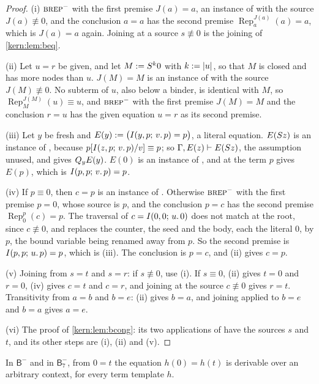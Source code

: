 \begin{proof}
(i) $\rulename{BRep}^{-}$ with the first premise $J(a)=a$, an instance of
 with the source $J(a)\not\equiv 0$, and the conclusion $a=a$ has
the second premise $\operatorname{Rep}_{a}^{J(a)}(a)=a$, which is $J(a)=a$
again.  Joining at a source $s\not\equiv 0$ is the joining of
\cref{kern:lem:beq}.

(ii) Let $u=r$ be given, and let $M\mathrel{:=}S^{k}0$ with $k\mathrel{:=}|u|$, so
that $M$ is closed and has more nodes than $u$.  $J(M)=M$ is an instance of
 with the source $J(M)\not\equiv 0$.  No subterm of $u$, also
below a binder, is identical with $M$, so
$\operatorname{Rep}_{M}^{J(M)}(u)\equiv u$, and $\rulename{BRep}^{-}$ with the
first premise $J(M)=M$ and the conclusion $r=u$ has the given equation $u=r$
as its second premise.

(iii) Let $y$ be fresh and $E(y)\mathrel{:=}\bigl(I(y,p;\,v.\,p)=p\bigr)$, a
literal equation.  $E(S z)$ is an instance of , because
$p[I(z,p;\,v.\,p)/v]\equiv p$; so $\Gamma,E(z)\vdash E(S z)$, the
assumption unused, and  gives $Q_{y}E(y)$.  $E(0)$ is an
instance of , and  at the term $p$ gives $E(p)$,
which is $I(p,p;\,v.\,p)=p$.

(iv) If $p\equiv 0$, then $c=p$ is an instance of .  Otherwise
$\rulename{BRep}^{-}$ with the first premise $p=0$, whose source is $p$, and
the conclusion $p=c$ has the second premise
$\operatorname{Rep}_{0}^{p}(c)=p$.  The traversal of $c=I(0,0;\,u.\,0)$ does
not match at the root, since $c\not\equiv 0$, and replaces the counter, the
seed and the body, each the literal $0$, by $p$, the bound variable being
renamed away from $p$.  So the second premise is $I(p,p;\,u.\,p)=p$, which is
(iii).  The conclusion is $p=c$, and (ii) gives $c=p$.

(v) Joining from $s=t$ and $s=r$: if $s\not\equiv 0$, use (i).  If
$s\equiv 0$, (ii) gives $t=0$ and $r=0$, (iv) gives $c=t$ and $c=r$, and
joining at the source $c\not\equiv 0$ gives $r=t$.  Transitivity from $a=b$
and $b=e$: (ii) gives $b=a$, and joining applied to $b=e$ and $b=a$ gives
$a=e$.

(vi) The proof of \cref{kern:lem:bcong}: its two applications of
 have the sources $s$ and $t$, and its other steps are
(i), (ii) and (v).
\end{proof}

\begin{lemma}
\label{kern:lem:bzero}
In $\mathsf{B}^{-}$ and in $\mathsf{B}^{-}_{7}$, from $0=t$ the equation
$h(0)=h(t)$ is derivable over an arbitrary context, for every term template
$h$.
\end{lemma}

